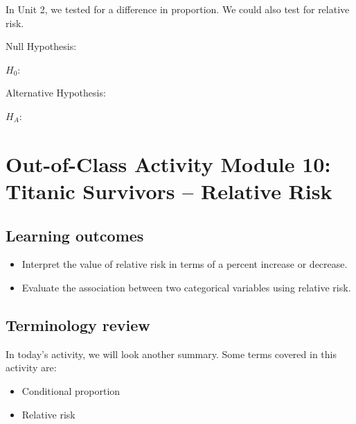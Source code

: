\documentclass[
]{report}
\begin{document}
In Unit 2, we tested for a difference in proportion. We could also test for relative risk.


Null Hypothesis:

\(H_0:\)

\vspace{0.2in}

Alternative Hypothesis:

\(H_A:\)

\vspace{0.2in}


\newpage

\hypertarget{out-of-class-activity-module-10-titanic-survivors-relative-risk}{%
\section{Out-of-Class Activity Module 10: Titanic Survivors -- Relative Risk}\label{out-of-class-activity-module-10-titanic-survivors-relative-risk}}


\hypertarget{learning-outcomes-20}{%
\subsection{Learning outcomes}\label{learning-outcomes-20}}

\begin{itemize}
\item
  Interpret the value of relative risk in terms of a percent increase or decrease.
\item
  Evaluate the association between two categorical variables using relative risk.
\end{itemize}

\hypertarget{terminology-review-17}{%
\subsection{Terminology review}\label{terminology-review-17}}

In today's activity, we will look another summary. Some terms covered in this activity are:

\begin{itemize}
\item
  Conditional proportion
\item
  Relative risk
\end{itemize}
\end{document}
